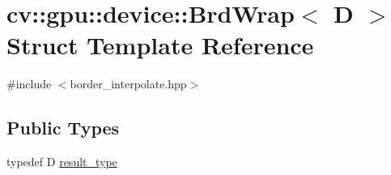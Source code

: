 \hypertarget{structcv_1_1gpu_1_1device_1_1BrdWrap}{\section{cv\-:\-:gpu\-:\-:device\-:\-:Brd\-Wrap$<$ D $>$ Struct Template Reference}
\label{structcv_1_1gpu_1_1device_1_1BrdWrap}
}


{\ttfamily \#include $<$border\-\_\-interpolate.\-hpp$>$}

\subsection*{Public Types}
\begin{DoxyCompactItemize}
\item 
typedef D \hyperlink{structcv_1_1gpu_1_1device_1_1BrdWrap_a02e0559636bf2be72d95f0919b260559}{result\-\_\-type}
\end{DoxyCompactItemize}
